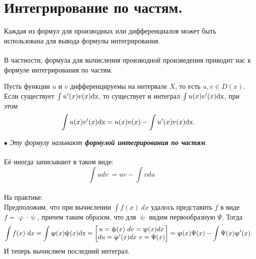 \section{Интегрирование по частям.}
Каждая из формул для производных или дифференциалов может быть использована для вывода формулы интегрирования.\\\\
В частности, формула для вычисления производной произведения приводит нас к формуле интегрирования по частям.
\begin{theorem}
	Пусть функции $u$ и $v$ дифференцируемы на интервале $X$, то есть $u, v \in D(x)$. Если существует $\int u'(x)v(x)\text{dx}$, то существует и интеграл $\int u(x)v'(x)\text{dx}$, при этом $$\int u(x)v'(x)\text{dx} = u(x)v(x) - \int u'(x)v(x)\text{dx}.$$
\end{theorem}
$\bullet$ \textit{Эту формулу называют\textbf{ формулой интегрирования по частям}.}\\\\
Её иногда записывают в таком виде:\\
\[
\boxed{\int\limits udv\ = uv - \int\limits vdu } \qquad
\]\\
На практике:\\
Предположим, что при вычислении $\int\limits f(x)\ dx $ удалось представить $f$ в виде $f = \upvarphi \cdot \uppsi$, причем таким образом, что для $\uppsi$ видим первообразную $\Psi$. Тогда\\
$$\int\limits f(x)\ dx = \int\limits \upvarphi(x)\uppsi(x)\text{dx} = \begin{bmatrix}  u = \upphi(x) \ dv = \upvarphi(x) dx  \\ du = \upvarphi '(x)dx \ v = \Psi (x)  \end{bmatrix} = \upvarphi (x) \Psi (x) - \int\limits \Psi(x) \upvarphi '(x).$$ И теперь вычисляем последний интеграл.
